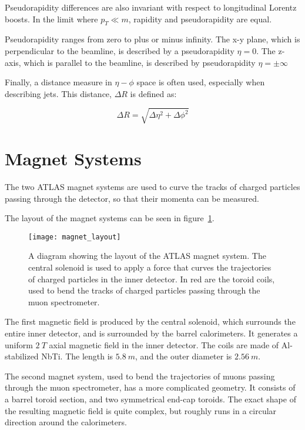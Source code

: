 Pseudorapidity differences are also invariant with respect to
longitudinal Lorentz boosts. In the limit where $p_T \ll m$, rapidity and
pseudorapidity are equal.

Pseudorapidity ranges from zero to plus or minus infinity.
The x-y plane, which is perpendicular to the beamline, is described by a pseudorapidity $\eta=0$.
The z-axis, which is parallel to the beamline, is described by pseudorapidity $\eta=\pm\infty$

Finally, a distance measure in $\eta-\phi$ space is often used, especially when describing jets.
This distance, $\Delta R$ is defined as:

\begin{equation}
\Delta R = \sqrt{\Delta\eta^2+\Delta\phi^2}
\end{equation}

\section{Magnet Systems}\label{sec:magnet_systems}
The two ATLAS magnet systems are used to curve the tracks of charged particles passing through the detector,
so that their momenta can be measured.

The layout of the magnet systems can be seen in figure~\ref{fig:magnet_layout}.

\begin{figure}[!htbp]
\texttt{[image: magnet\_layout]}
\caption{A diagram showing the layout of the ATLAS magnet system.
The central solenoid is used to apply a force that curves the trajectories of charged particles in the inner detector.
In red are the toroid coils, used to bend the tracks of charged particles passing through the muon spectrometer.}
\label{fig:magnet_layout}
\end{figure}

The first magnetic field is produced by the central solenoid, which surrounds the entire inner detector,
and is surrounded by the barrel calorimeters.
It generates a uniform $2~T$ axial magnetic field in the inner detector.
The coils are made of Al-stabilized NbTi. The length is $5.8~m$, and the outer diameter is $2.56~m$\cite{atlas-detector-2008}.

The second magnet system, used to bend the trajectories of muons passing through the muon spectrometer,
has a more complicated geometry.
It consists of a barrel toroid section, and two symmetrical end-cap toroids.
The exact shape of the resulting magnetic field is quite complex,
but roughly runs in a circular direction around the calorimeters.

